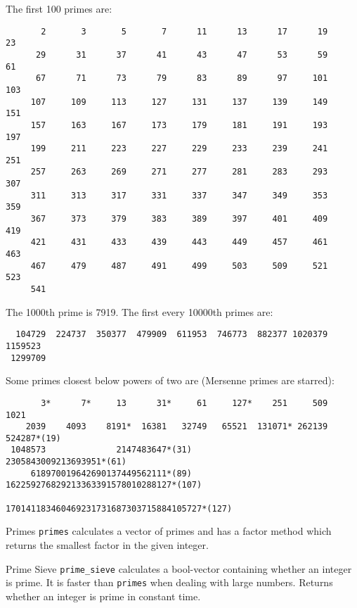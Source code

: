 
The first 100 primes are:
{\small
\begin{verbatim}
       2       3       5       7      11      13      17      19      23 
      29      31      37      41      43      47      53      59      61 
      67      71      73      79      83      89      97     101     103 
     107     109     113     127     131     137     139     149     151 
     157     163     167     173     179     181     191     193     197 
     199     211     223     227     229     233     239     241     251 
     257     263     269     271     277     281     283     293     307 
     311     313     317     331     337     347     349     353     359 
     367     373     379     383     389     397     401     409     419 
     421     431     433     439     443     449     457     461     463 
     467     479     487     491     499     503     509     521     523 
     541
\end{verbatim}
}

The 1000th prime is 7919. The first every 10000th primes are:
{\small
\begin{verbatim}
  104729  224737  350377  479909  611953  746773  882377 1020379 1159523
 1299709
\end{verbatim}
}

Some primes closest below powers of two are (Mersenne primes are starred):
{\small
\begin{verbatim}
       3*      7*     13      31*     61     127*    251     509    1021
    2039    4093    8191*  16381   32749   65521  131071* 262139  524287*(19)
 1048573              2147483647*(31)                2305843009213693951*(61)
     618970019642690137449562111*(89)  162259276829213363391578010288127*(107)
                                 170141183460469231731687303715884105727*(127)
\end{verbatim}
}


\begin{algorithm}{Primes}
\desc
{\tt primes} calculates a vector of primes and has a factor method which
returns the smallest factor in the given integer.
\end{algorithm}

\begin{algorithm}{Prime Sieve}
\desc
{\tt prime\_sieve} calculates a bool-vector containing whether an integer
is prime. It is faster than {\tt primes} when dealing with large numbers.
Returns whether an integer is prime in constant time.
\end{algorithm}

